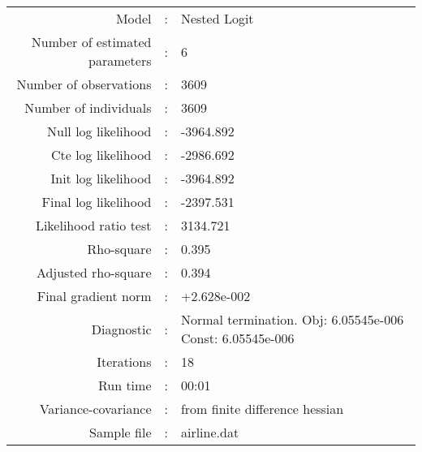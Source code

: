 

\begin{flushleft}
\begin{tabular}{rcl}
\hline
Model &:& Nested Logit\\
Number of estimated parameters&:&6\\
Number of  observations &:& 3609\\
Number of individuals&:&3609\\
Null log likelihood&:&-3964.892\\
Cte log likelihood&:&-2986.692\\
Init log likelihood&:&-3964.892\\
Final log likelihood&:&-2397.531\\
Likelihood ratio test &:&3134.721\\
Rho-square&:&0.395\\
Adjusted rho-square&:&0.394\\
Final gradient norm&:&+2.628e-002\\
Diagnostic&:&Normal termination. Obj: 6.05545e-006 Const: 6.05545e-006\\
Iterations&:&18\\
Run time&:&00:01\\
Variance-covariance&:&from finite difference hessian\\
Sample file&:&airline.dat\\
\end{tabular}
\end{flushleft}

